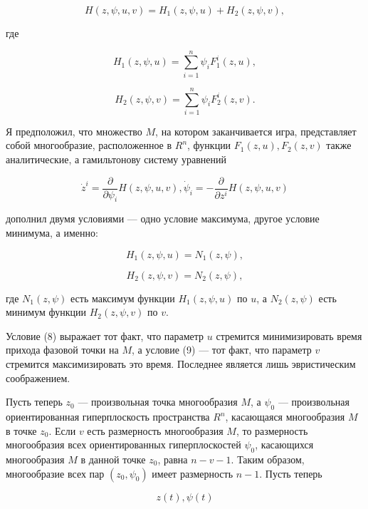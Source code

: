 \documentclass[10pt]{article}
\begin{document}
\[
H\left( {z,\psi,u,v}\right)  = {H}_{1}\left( {z,\psi,u}\right)  + {H}_{2}\left( {z,\psi,v}\right),
\]

где

\[
{H}_{1}\left( {z,\psi,u}\right)  = \mathop{\sum }\limits_{{i = 1}}^{n}{\psi }_{i}{F}_{1}^{i}\left( {z,u}\right), \tag{5}
\]

\[
{H}_{2}\left( {z,\psi,v}\right)  = \mathop{\sum }\limits_{{i = 1}}^{n}{\psi }_{i}{F}_{2}^{i}\left( {z,v}\right). \tag{6}
\]

Я предположил, что множество \(M\), на котором заканчивается игра, представляет собой многообразие, расположенное в \({R}^{n}\), функции \({F}_{1}\left( {z,u}\right),{F}_{2}\left( {z,v}\right)\) также аналитические, а гамильтонову систему уравнений

\[
{\dot{z}}^{i} = \frac{\partial }{\partial {\psi }_{i}}H\left( {z,\psi,u,v}\right),{\dot{\psi }}_{i} =  - \frac{\partial }{\partial {z}^{i}}H\left( {z,\psi,u,v}\right) \tag{7}
\]

дополнил двумя условиями — одно условие максимума, другое условие минимума, а именно:

\[
{H}_{1}\left( {z,\psi,u}\right)  = {N}_{1}\left( {z,\psi }\right), \tag{8}
\]

\[
{H}_{2}\left( {z,\psi,v}\right)  = {N}_{2}\left( {z,\psi }\right), \tag{9}
\]

где \({N}_{1}\left( {z,\psi }\right)\) есть максимум функции \({H}_{1}\left( {z,\psi,u}\right)\) по \(u\), а \({N}_{2}\left( {z,\psi }\right)\) есть минимум функции \({H}_{2}\left( {z,\psi,v}\right)\) по \(v\).

Условие (8) выражает тот факт, что параметр \(u\) стремится минимизировать время прихода фазовой точки на \(M\), а условие (9) — тот факт, что параметр \(v\) стремится максимизировать это время. Последнее является лишь эвристическим соображением.

Пусть теперь \({z}_{0}\) — произвольная точка многообразия \(M\), а \({\psi }_{0}\) — произвольная ориентированная гиперплоскость пространства \({R}^{n}\), касающаяся многообразия \(M\) в точке \({z}_{0}\). Если \(v\) есть размерность многообразия \(M\), то размерность многообразия всех ориентированных гиперплоскостей \({\psi }_{0}\), касающихся многообразия \(M\) в данной точке \({z}_{0}\), равна \(n - v - 1\). Таким образом, многообразие всех пар \(\left( {{z}_{0},{\psi }_{0}}\right)\) имеет размерность \(n - 1\). Пусть теперь

\[
z\left( t\right),\psi \left( t\right) \tag{10}
\]
\end{document}
